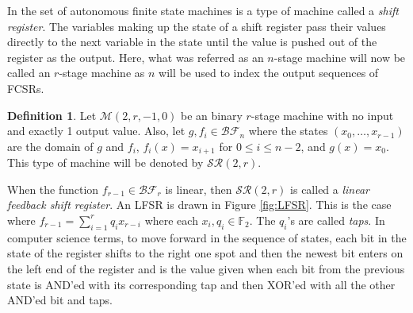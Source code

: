 \documentclass[english]{article}
\def\gftwo{\mathbb{F}_2}
\def\BF{\mathcal{BF}}
\theoremstyle{plain}
\theoremstyle{definition}
\newtheorem{definition}[theorem]{Definition}%
\theoremstyle{remark}
\begin{document}
\par In the set of autonomous finite state machines is a type of machine
called a {\it shift register}. The variables making up the state of a shift
register pass their values directly to the next variable in the state until
the value is pushed out of the register as the output. Here, what was referred
as an $n$-stage machine will now be called an $r$-stage machine as $n$ will be
used to index the output sequences of FCSRs.

\begin{definition}\label{def:shift-register}
  Let $\mathcal{M}(2,r,-1,0)$ be an binary $r$-stage machine with no input
  and exactly 1 output value. Also, let $g,f_i\in\BF_n$ where the states
  $(x_0,\dots,x_{r-1})$ are the domain of $g$ and $f_i$, $f_i(x)=x_{i+1}$ for
  $0\leq i \leq n-2$, and $g(x)=x_0$. This type of machine will be denoted
  by $\mathcal{SR}(2,r)$.
\end{definition}

\par When the function $f_{r-1}\in\BF_r$ is linear, then $\mathcal{SR}(2,r)$ is
called a {\it linear feedback shift register}. An LFSR is drawn in Figure
\ref{fig:LFSR}. This is the case where $f_{r-1}=\sum_{i=1}^rq_ix_{r-i}$ where
each $x_i,q_i \in \gftwo$. The $q_i$'s are called {\it taps}. In computer
science terms, to move forward in the sequence of states, each bit in the state
of the register shifts to the right one spot and then the newest bit enters
on the left end of the register and is the value given when each bit from
the previous state is AND'ed with its corresponding tap and then XOR'ed with
all the other AND'ed bit and taps.
\end{document}
